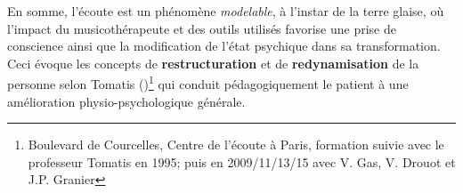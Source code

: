 















En somme, l'écoute est un phénomène \textit{modelable}, à l'instar de
la terre glaise, où l'impact du musicothérapeute et des outils utilisés favorise une prise de
conscience ainsi que la modification
de  l'état psychique dans sa transformation.
Ceci évoque les concepts de \textbf{restructuration }et de
\textbf{redynamisation} de la personne selon Tomatis (\cite{tomatis.com})\footnote{Boulevard de Courcelles, Centre de l'écoute à Paris, formation
  suivie avec le professeur Tomatis en 1995; puis en 2009/11/13/15 avec V. Gas, V. Drouot et
J.P. Granier}
qui conduit pédagogiquement le patient à une amélioration physio-psychologique
générale.



